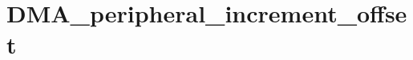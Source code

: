 \hypertarget{group___d_m_a__peripheral__increment__offset}{\section{D\-M\-A\-\_\-peripheral\-\_\-increment\-\_\-offset}
\label{group___d_m_a__peripheral__increment__offset}
}

